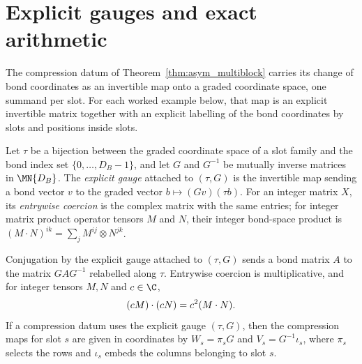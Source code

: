 \section{Explicit gauges and exact arithmetic}%
\label{sec:asymex_explicit_gauge}

The compression datum of Theorem~\ref{thm:asym_multiblock} carries its
change of bond coordinates as an invertible map onto a graded coordinate
space, one summand per slot. For each worked example below, that map is an explicit
invertible matrix together with an explicit labelling of the bond
coordinates by slots and positions inside slots.

\begin{definition}
    \label{def:asymex_explicit_gauge}
    \leanok
    Let $\tau$ be a bijection between the graded coordinate space of a slot
    family and the bond index set $\{0,\ldots,D_B-1\}$, and let $G$ and
    $G^{-1}$ be mutually inverse matrices in $\MN{D_B}$. The \emph{explicit
        gauge} attached to $(\tau,G)$ is the invertible map sending a bond
    vector $v$ to the graded vector $b\mapsto(Gv)(\tau b)$. For an integer
    matrix $X$, its \emph{entrywise coercion} is the complex matrix with the
    same entries; for integer matrix product operator tensors $M$ and $N$,
    their integer bond-space product is
    $(M\mathbin{\cdot}N)^{ik}=\sum_jM^{ij}\otimes N^{jk}$.
\end{definition}

\begin{theorem}
    \label{thm:asymex_explicit_gauge}
    \leanok
    Conjugation by the explicit gauge attached to $(\tau,G)$ sends a bond
    matrix $A$ to the matrix $GAG^{-1}$ relabelled along $\tau$. Entrywise
    coercion is multiplicative, and for integer tensors $M, N$ and $c \in \C$,
    \begin{align}
        (cM) \mathbin{\cdot} (cN) = c^2 (M \mathbin{\cdot} N). \notag
    \end{align}
    If a compression datum uses the explicit gauge $(\tau,G)$, then the
    compression maps for slot $s$ are given in coordinates by
    $W_s = \pi_s G$ and $V_s = G^{-1} \iota_s$, where $\pi_s$ selects the rows
    and $\iota_s$ embeds the columns belonging to slot $s$.
\end{theorem}


